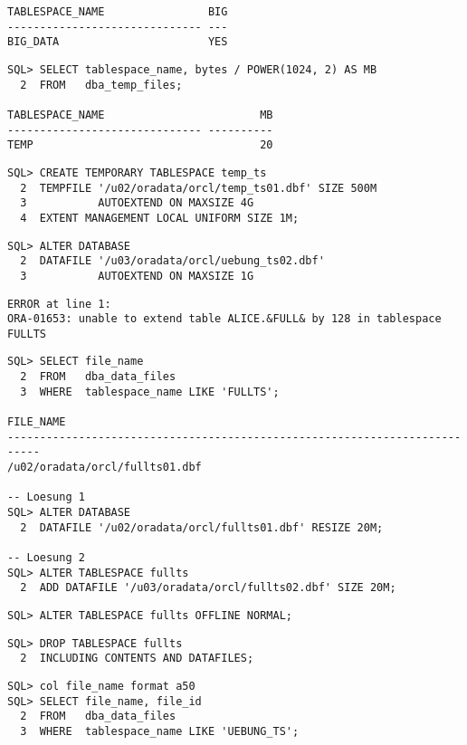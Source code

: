 \begin{enumerate}
\begin{lstlisting}[language=oracle_sql]
TABLESPACE_NAME                BIG
------------------------------ ---
BIG_DATA                       YES

      \end{lstlisting}
    
      \begin{lstlisting}[language=oracle_sql]
SQL> SELECT tablespace_name, bytes / POWER(1024, 2) AS MB
  2  FROM   dba_temp_files;

TABLESPACE_NAME                        MB
------------------------------ ----------
TEMP                                   20
      \end{lstlisting}
    
      \begin{lstlisting}[language=oracle_sql]
SQL> CREATE TEMPORARY TABLESPACE temp_ts
  2  TEMPFILE '/u02/oradata/orcl/temp_ts01.dbf' SIZE 500M
  3           AUTOEXTEND ON MAXSIZE 4G
  4  EXTENT MANAGEMENT LOCAL UNIFORM SIZE 1M;
      \end{lstlisting}
\clearpage
    
      \begin{lstlisting}[language=oracle_sql]
SQL> ALTER DATABASE
  2  DATAFILE '/u03/oradata/orcl/uebung_ts02.dbf'
  3           AUTOEXTEND ON MAXSIZE 1G
      \end{lstlisting}
    
    
		\begin{lstlisting}[language=oracle_sql]
ERROR at line 1:
ORA-01653: unable to extend table ALICE.&FULL& by 128 in tablespace FULLTS
		\end{lstlisting}
		
      \begin{lstlisting}[language=oracle_sql]
SQL> SELECT file_name
  2  FROM   dba_data_files
  3  WHERE  tablespace_name LIKE 'FULLTS';

FILE_NAME
---------------------------------------------------------------------------
/u02/oradata/orcl/fullts01.dbf

-- Loesung 1
SQL> ALTER DATABASE
  2  DATAFILE '/u02/oradata/orcl/fullts01.dbf' RESIZE 20M;

-- Loesung 2
SQL> ALTER TABLESPACE fullts
  2  ADD DATAFILE '/u03/oradata/orcl/fullts02.dbf' SIZE 20M;
      \end{lstlisting}
\clearpage
    
      \begin{lstlisting}[language=oracle_sql]
SQL> ALTER TABLESPACE fullts OFFLINE NORMAL;
      \end{lstlisting}
    
      \begin{lstlisting}[language=oracle_sql]
SQL> DROP TABLESPACE fullts
  2  INCLUDING CONTENTS AND DATAFILES;
      \end{lstlisting}
    
      \begin{lstlisting}[language=oracle_sql,alsolanguage=sqlplus]
SQL> col file_name format a50
SQL> SELECT file_name, file_id
  2  FROM   dba_data_files
  3  WHERE  tablespace_name LIKE 'UEBUNG_TS';


\end{lstlisting}
\end{enumerate}
